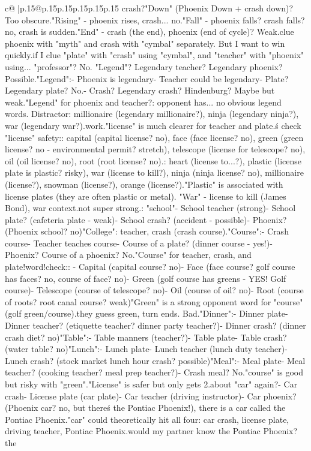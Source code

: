 \documentclass{article}
\begin{document}
{\begin{supertabular}{c@{$\;$}|p{.15\linewidth}@{}p{.15\linewidth}p{.15\linewidth}p{.15\linewidth}p{.15\linewidth}p{.15\linewidth}}
{{{crash?\n"Down" (Phoenix Down + crash down)? Too obscure.\n"Rising" - phoenix rises, crash... no.\n"Fall" - phoenix falls? crash falls? no, crash is sudden.\n"End" - crash (the end), phoenix (end of cycle)? Weak.\n\nMaybe clue phoenix with "myth" and crash with "cymbal" separately. But I want to win quickly.\n\nWhat if I clue "plate" with "crash" using "cymbal", and "teacher" with "phoenix" using... "professor"? No. "Legend"? Legendary teacher? Legendary phoenix? Possible.\n\n"Legend":\n- Phoenix is legendary\n- Teacher could be legendary\n- Plate? Legendary plate? No.\n- Crash? Legendary crash? Hindenburg? Maybe but weak.\n\n"Legend" for phoenix and teacher?\nRisk: opponent has... no obvious legend words. Distractor: millionaire (legendary millionaire?), ninja (legendary ninja?), war (legendary war?).\nCould work.\n\nBut "license" is much clearer for teacher and plate.\n\nLet\'s check "license" safety:\nOpponent: capital (capital license? no), face (face license? no), green (green license? no - environmental permit? stretch), telescope (license for telescope? no), oil (oil license? no), root (root license? no).\nDistractors: heart (license to...?), plastic (license plate is plastic? risky), war (license to kill?), ninja (ninja license? no), millionaire (license?), snowman (license?), orange (license?).\n"Plastic" is associated with license plates (they are often plastic or metal). "War" - license to kill (James Bond), war context.\nBut not super strong.\n\nAlternative: "school"\n- School teacher (strong)\n- School plate? (cafeteria plate - weak)\n- School crash? (accident - possible)\n- Phoenix? (Phoenix school? no)\n\n"College": teacher, crash (crash course).\n\n"Course":\n- Crash course\n- Teacher teaches course\n- Course of a plate? (dinner course - yes!)\n- Phoenix? Course of a phoenix? No.\n\n"Course" for teacher, crash, and plate!\nTriple word!\nSafety check:\nOpponent: \n- Capital (capital course? no)\n- Face (face course? golf course has faces? no, course of face? no)\n- Green (golf course has greens - YES! Golf course)\n- Telescope (course of telescope? no)\n- Oil (course of oil? no)\n- Root (course of roots? root canal course? weak)\n"Green" is a strong opponent word for "course" (golf green/course).\nIf they guess green, turn ends. Bad.\n\n"Dinner":\n- Dinner plate\n- Dinner teacher? (etiquette teacher? dinner party teacher?)\n- Dinner crash? (dinner crash diet? no)\n\n"Table":\n- Table manners (teacher?)\n- Table plate\n- Table crash? (water table? no)\n\n"Lunch":\n- Lunch plate\n- Lunch teacher (lunch duty teacher)\n- Lunch crash? (stock market lunch hour crash? possible)\n\n"Meal":\n- Meal plate\n- Meal teacher? (cooking teacher? meal prep teacher?)\n- Crash meal? No.\n\nSo "course" is good but risky with "green".\n"License" is safer but only gets 2.\n\nWhat about "car" again?\n- Car crash\n- License plate (car plate)\n- Car teacher (driving instructor)\n- Car phoenix? (Phoenix car? no, but there\'s the Pontiac Phoenix!)\nWait, there is a car called the Pontiac Phoenix.\nSo "car" could theoretically hit all four: car crash, license plate, driving teacher, Pontiac Phoenix.\nBut would my partner know the Pontiac Phoenix?\nAnd the }}}
\end{supertabular}}
\end{document}
